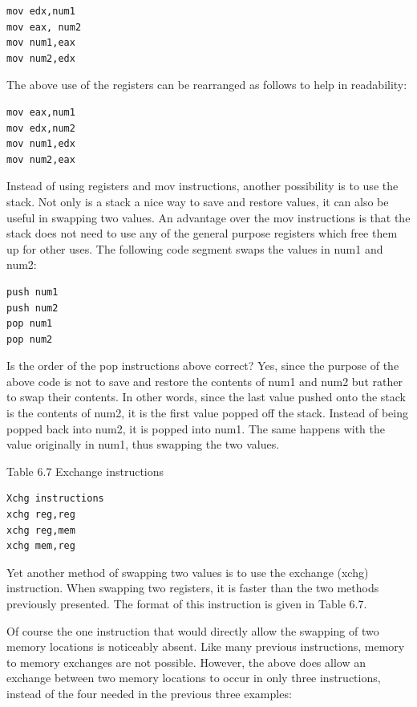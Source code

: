 \documentclass[10pt]{book}
\begin{document}
\begin{verbatim}
mov edx,num1
mov eax, num2
mov num1,eax
mov num2,edx
\end{verbatim}

The above use of the registers can be rearranged as follows to help in readability:

\begin{verbatim}
mov eax,num1
mov edx,num2
mov num1,edx
mov num2,eax
\end{verbatim}

Instead of using registers and mov instructions, another possibility is to use the stack. Not only is a stack a nice way to save and restore values, it can also be useful in swapping two values. An advantage over the mov instructions is that the stack does not need to use any of the general purpose registers which free them up for other uses. The following code segment swaps the values in num1 and num2:

\begin{verbatim}
push num1
push num2
pop num1
pop num2
\end{verbatim}

Is the order of the pop instructions above correct? Yes, since the purpose of the above code is not to save and restore the contents of num1 and num2 but rather to swap their contents. In other words, since the last value pushed onto the stack is the contents of num2, it is the first value popped off the stack. Instead of being popped back into num2, it is popped into num1. The same happens with the value originally in num1, thus swapping the two values.

Table 6.7 Exchange instructions

\begin{verbatim}
Xchg instructions
xchg reg,reg
xchg reg,mem
xchg mem,reg
\end{verbatim}

Yet another method of swapping two values is to use the exchange (xchg) instruction. When swapping two registers, it is faster than the two methods previously presented. The format of this instruction is given in Table 6.7.


Of course the one instruction that would directly allow the swapping of two memory locations is noticeably absent. Like many previous instructions, memory to memory exchanges are not possible. However, the above does allow an exchange between two memory locations to occur in only three instructions, instead of the four needed in the previous three examples:
\end{document}
